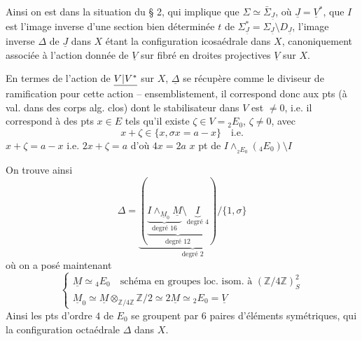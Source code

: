 Ainsi on est dans la situation du § 2, qui implique que $\Sigma\simeq\bar\Sigma_{\underline J}$, où $\underline J=\underline V^*$, que $I$ est l'image inverse d'une section bien déterminée $t$ de $\Sigma_{\underline J}^*=\Sigma_{\underline J}\setminus D_{\underline J}$, l'image inverse $\Delta$ de $\underline J$ dans $X$ étant  la configuration icosaédrale dans $X$, canoniquement associée à l'action donnée de $\underline V$ sur  fibré en droites projectives $\underline V$ sur $X$.

En termes de l'action de $\underline{V|V^*}$ sur $X$, $\underline\Delta$ se récupère comme le diviseur de ramification pour cette action -- ensemblistement, il correspond donc aux pts (à val. dans des corps alg. clos) dont le stabilisateur dans $V$ est $\ne0$, i.e. il correspond à des pts $x\in E$ tels qu'il existe $\zeta\in V={}_2E_0$, $\zeta\ne0$, avec
\[
 x+\zeta\in\{x,\sigma x=a-x\}\quad\text{i.e.}
\]
$x+\zeta=a-x$ i.e. $2x+\zeta=a$ d'où $4x=2a$  
$x$ pt de $I\wedge_{{}_2E_0}({}_4E_0)\setminus I$

On trouve ainsi
\[
\tag{27}\Delta=
\underbrace{\left(\underbrace{\underbrace{I\wedge_{\underline M_0}\underline M}_{\text{degré }16}\setminus\underbrace{I}_{\text{degré }4}}_{\text{degré }12}\right)/\{1,\sigma\}}_{\text{degré }2}
\]
où on a posé maintenant
\[
\tag{28}\left\{\begin{array}{l}
\underline M\simeq{}_4E_0\quad\text{schéma en groupes loc. isom. à }(\mathbb Z/4\mathbb Z)^2_S\\
\underline M_0\simeq\underline M\otimes_{\mathbb Z/4\mathbb Z}\mathbb Z/2\simeq2\underline M\simeq{}_2E_0=\underline V
\end{array}\right.
\]
Ainsi  les pts d'ordre $4$ de $E_0$ se groupent par $6$ paires d'éléments symétriques, qui  la configuration octaédrale $\Delta$ dans $X$.

